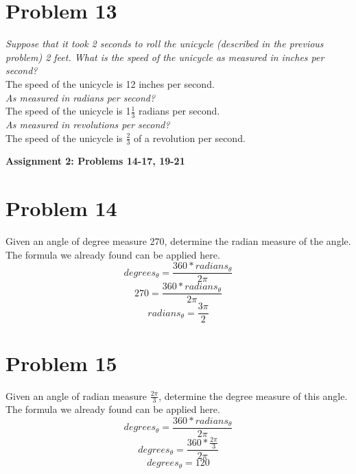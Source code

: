 \documentclass[11pt]{article} %
\newcommand\tab[1][1cm]{\hspace*{#1}}
\begin{document}
\section{Problem 13}
\textit{Suppose that it took 2 seconds to roll the unicycle (described in the previous problem) 2 feet. What is the speed of the unicycle as measured in inches per second?}\\
\tab The speed of the unicycle is 12 inches per second. 
\\ \textit{As measured in radians per second?}\\
\tab The speed of the unicycle is 1$\frac{1}{3}$ radians per second.
\\ \textit{As measured in revolutions per second?}
\\
\tab The speed of the unicycle is $\frac{2}{3}$ of a revolution per second.

\textbf{Assignment 2: Problems 14-17, 19-21}
\\
\section{Problem 14}
Given an angle of degree measure 270, determine the radian measure of the angle.
\tab The formula we already found can be applied here. 
\begin{displaymath} degrees_\theta = \frac{360*radians_\theta}{2\pi} \end{displaymath} 
\begin{displaymath} 270 = \frac{360*radians_\theta}{2\pi} \end{displaymath} 
\begin{displaymath} radians_\theta = \frac{3\pi}{2} \end{displaymath} 

\section{Problem 15} 
Given an angle of radian measure $\frac{2\pi}{3}$, determine the degree measure of this angle.
\tab The formula we already found can be applied here. 
\begin{displaymath} degrees_\theta = \frac{360*radians_\theta}{2\pi} \end{displaymath} 
\begin{displaymath} degrees_\theta = \frac{360*\frac{2\pi}{3}}{2\pi} \end{displaymath} 
\begin{displaymath} degrees_\theta = 120  \end{displaymath} 
\end{document}
